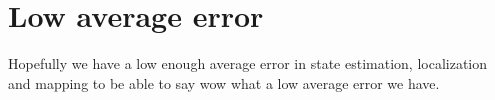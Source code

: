 \section{Low average error}

Hopefully we have a low enough average error in state estimation, localization and mapping to be able to say wow what a low average error we have.